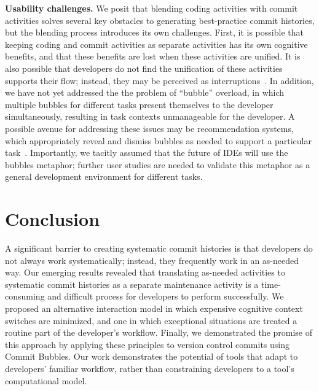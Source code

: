 \documentclass[conference]{IEEEtran}
\begin{document}
\textbf{Usability challenges.} We posit that blending coding activities with commit activities solves several key obstacles to generating best-practice commit histories, but the blending process introduces its own challenges. 
First, it is possible that keeping coding and commit activities as separate activities has its own cognitive benefits, and that these benefits are lost when these activities are unified. 
It is also possible that developers do not find the unification of these activities supports their flow; instead, they may be perceived as interruptions~\cite{Parnin2012}. 
In addition, we have not yet addressed the the problem of ``bubble'' overload, in which multiple bubbles for different tasks present themselves to the developer simultaneously, resulting in task contexts unmanageable for the developer. 
A possible avenue for addressing these issues may be recommendation systems, which appropriately reveal and dismiss bubbles as needed to support a particular task~\cite{Robillard2010a, Murphy2005}.
Importantly, we tacitly assumed that the future of IDEs will use the bubbles metaphor; further user studies are needed to validate this metaphor as a general development environment for different tasks.


\section{Conclusion}

A significant barrier to creating systematic commit histories is that developers do not always work systematically; instead, they frequently work in an as-needed way. 
Our emerging results revealed that translating as-needed activities to systematic commit histories as a separate maintenance activity is a time-consuming and difficult process for developers to perform successfully. 
We proposed an alternative interaction model in which expensive cognitive context switches are minimized, and one in which exceptional situations
are treated a routine part of the developer's workflow. 
Finally, we demonstrated the promise of this approach by applying these principles to version control commits using Commit Bubbles. 
Our work demonstrates the potential of tools that adapt to developers' familiar workflow, rather than constraining developers to a tool's computational model.

\end{document}

